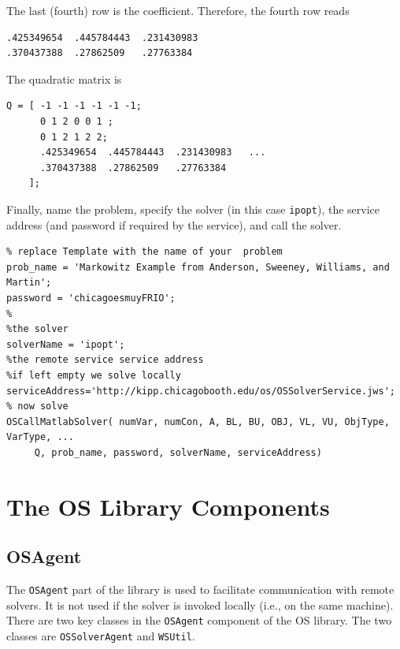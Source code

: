 \documentclass[11pt]{article}
\renewcommand{\_}{{\char"5F}}
\renewcommand{\{}{{\char"7B}}
\renewcommand{\}}{{\char"7D}}
\renewcommand{\^}{{\char"0D}}
\renewcommand{\'}{{\char"0D}}
\begin{document}
\begin{enumerate}[Step 1:]
The last (fourth) row is the coefficient. Therefore, the fourth row reads





\begin{verbatim}
.425349654  .445784443  .231430983
.370437388  .27862509   .27763384
\end{verbatim}


The quadratic matrix is



\begin{verbatim}
Q = [ -1 -1 -1 -1 -1 -1;
      0 1 2 0 0 1 ;
      0 1 2 1 2 2;
      .425349654  .445784443  .231430983   ...
      .370437388  .27862509   .27763384
    ];
\end{verbatim}


Finally, name the problem, specify the solver (in this case {\tt ipopt}), the service address (and password if required by the service), and call the solver.



\begin{verbatim}
% replace Template with the name of your  problem
prob_name = 'Markowitz Example from Anderson, Sweeney, Williams, and Martin';
password = 'chicagoesmuyFRIO';
%
%the solver
solverName = 'ipopt';
%the remote service service address
%if left empty we solve locally
serviceAddress='http://kipp.chicagobooth.edu/os/OSSolverService.jws';
% now solve
OSCallMatlabSolver( numVar, numCon, A, BL, BU, OBJ, VL, VU, ObjType, VarType, ...
     Q, prob_name, password, solverName, serviceAddress)
\end{verbatim}



\section{The OS Library Components}\label{section:oslibrary} 

\subsection{OSAgent}\label{section:osagent}

The {\tt OSAgent}  part of the library is used to facilitate communication
with remote solvers. It is not used if the solver is invoked locally (i.e., on the same machine).
There are two key classes in the {\tt OSAgent} component of the OS library. The two classes are
{\tt OSSolverAgent} and {\tt WSUtil}.


\end{enumerate}
\end{document}
